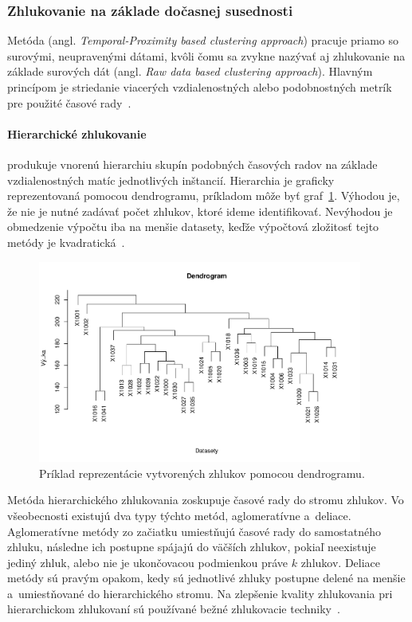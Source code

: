 \documentclass[a4paper,twoside,slovak,12pt,appendix]{article}
\begin{document}
\subsubsection{Zhlukovanie na základe dočasnej susednosti}
\label{c:raw-data-clustering}
Metóda (angl. \textit{Temporal-Proximity based clustering approach}) pracuje
priamo so surovými, neupravenými dátami, kvôli čomu sa zvykne nazývať aj
zhlukovanie na základe surových dát (angl. \textit{Raw data based clustering
approach}). Hlavným princípom je striedanie viacerých vzdialenostných alebo
podobnostných metrík pre použité časové rady~\cite{Rani2012}.

\label{c:hierarchical-clustering}
\paragraph{Hierarchické zhlukovanie} produkuje vnorenú hierarchiu skupín
podobných časových radov na základe vzdialenostných matíc jednotlivých
inštancií. Hierarchia je graficky reprezentovaná pomocou dendrogramu, príkladom
môže byť graf~\ref{fig:hierarchical-clustering}. Výhodou je, že nie je nutné
zadávať počet zhlukov, ktoré ideme identifikovať. Nevýhodou je obmedzenie
výpočtu iba na menšie datasety, keďže výpočtová zložitosť tejto metódy je
kvadratická~\cite{Dzeroski2007}.

\begin{figure}[htbp]
  \centering
  \includegraphics[width=0.95\textwidth]{hierarchical_clustering.pdf}
  \caption{Príklad reprezentácie vytvorených zhlukov pomocou dendrogramu.}
  \label{fig:hierarchical-clustering}
\end{figure}

\noindent
Metóda hierarchického zhlukovania zoskupuje časové rady do stromu zhlukov. Vo
všeobecnosti existujú dva typy týchto metód, aglomeratívne a~deliace.
Aglomeratívne metódy zo začiatku umiestňujú časové rady do samostatného zhluku,
následne ich postupne spájajú do väčších zhlukov, pokiaľ neexistuje jediný
zhluk, alebo nie je ukončovacou podmienkou práve $k$ zhlukov. Deliace metódy sú
pravým opakom, kedy sú jednotlivé zhluky postupne delené na menšie
a~umiestňované do hierarchického stromu. Na zlepšenie kvality zhlukovania pri
hierarchickom zhlukovaní sú používané bežné zhlukovacie
techniky~\cite{WarrenLiao2005}.
\end{document}

